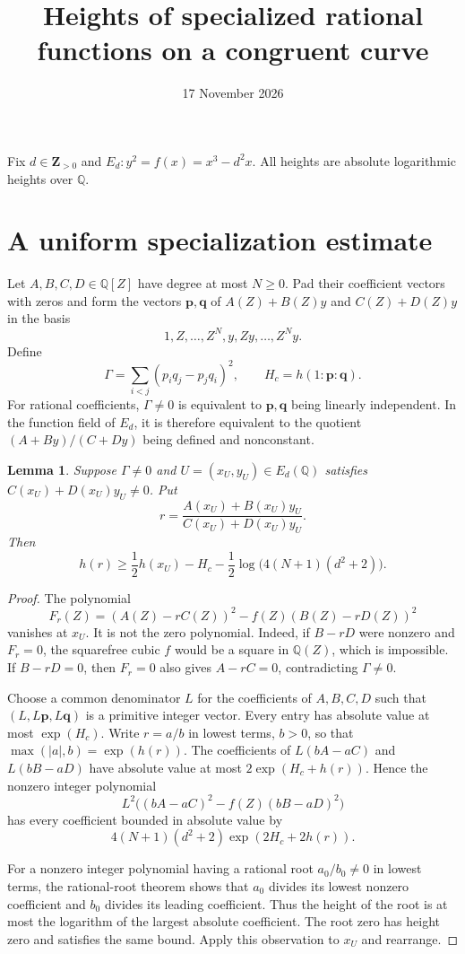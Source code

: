 \documentclass[11pt,a4paper]{article}
\title{Heights of specialized rational functions on a congruent curve}
\author{}\date{17 November 2026}
\newtheorem{lemma}{Lemma}[section]
\newcommand{\Q}{\mathbb Q}
\begin{document}
\maketitle

Fix $d\in\mathbf Z_{>0}$ and
$E_d:y^2=f(x)=x^3-d^2x$. All heights are absolute logarithmic
heights over $\Q$.

\section{A uniform specialization estimate}

Let $A,B,C,D\in\Q[Z]$ have degree at most $N\ge0$.
Pad their coefficient vectors with zeros and form the vectors
$\mathbf p,\mathbf q$ of $A(Z)+B(Z)y$ and $C(Z)+D(Z)y$
in the basis
\[
                  1,Z,\ldots,Z^N,y,Zy,\ldots,Z^Ny.
\]
Define
\[
 \Gamma=\sum_{i<j}(p_iq_j-p_jq_i)^2,\qquad
 H_c=h(1:\mathbf p:\mathbf q).
\]
For rational coefficients, $\Gamma\ne0$ is equivalent to
$\mathbf p,\mathbf q$ being linearly independent. In the function
field of $E_d$, it is therefore equivalent to the quotient
$(A+By)/(C+Dy)$ being defined and nonconstant.

\begin{lemma}\label{lem:coefficient}
Suppose $\Gamma\ne0$ and $U=(x_U,y_U)\in E_d(\Q)$ satisfies
$C(x_U)+D(x_U)y_U\ne0$. Put
\[
                   r=\frac{A(x_U)+B(x_U)y_U}{C(x_U)+D(x_U)y_U}.
\]
Then
\[
 h(r)\ge\frac12h(x_U)-H_c
               -\frac12\log\bigl(4(N+1)(d^2+2)\bigr).
\]
\end{lemma}
\begin{proof}
The polynomial
\[
  F_r(Z)=(A(Z)-rC(Z))^2-f(Z)(B(Z)-rD(Z))^2
\]
vanishes at $x_U$. It is not the zero polynomial. Indeed, if
$B-rD$ were nonzero and $F_r=0$, the squarefree cubic $f$
would be a square in $\Q(Z)$, which is impossible. If
$B-rD=0$, then $F_r=0$ also gives $A-rC=0$, contradicting
$\Gamma\ne0$.

Choose a common denominator $L$ for the coefficients of
$A,B,C,D$ such that
$(L,L\mathbf p,L\mathbf q)$ is a primitive integer vector.
Every entry has absolute value at most $\exp(H_c)$.
Write $r=a/b$ in lowest terms, $b>0$, so that
$\max(|a|,b)=\exp(h(r))$.
The coefficients of
$L(bA-aC)$ and $L(bB-aD)$ have absolute value at most
$2\exp(H_c+h(r))$. Hence the nonzero integer polynomial
\[
 L^2\bigl((bA-aC)^2-f(Z)(bB-aD)^2\bigr)
\]
has every coefficient bounded in absolute value by
\[
                 4(N+1)(d^2+2)\exp(2H_c+2h(r)).
\]

For a nonzero integer polynomial having a rational root
$a_0/b_0\ne0$ in lowest terms, the rational-root theorem
shows that $a_0$ divides its lowest nonzero coefficient and
$b_0$ divides its leading coefficient. Thus the height of the root is
at most the logarithm of the largest absolute coefficient.
The root zero has height zero and satisfies the same bound.
Apply this observation to $x_U$ and rearrange.
\end{proof}
\end{document}
